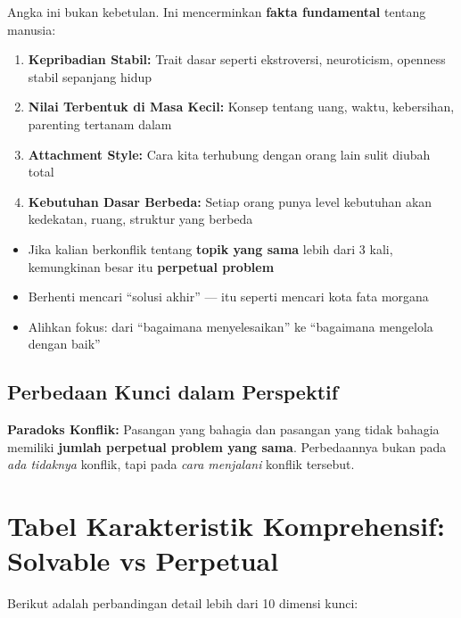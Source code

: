 Angka ini bukan kebetulan. Ini mencerminkan \textbf{fakta fundamental} tentang manusia:

\begin{enumerate}
    \item \textbf{Kepribadian Stabil:} Trait dasar seperti ekstroversi, neuroticism, openness stabil sepanjang hidup
    \item \textbf{Nilai Terbentuk di Masa Kecil:} Konsep tentang uang, waktu, kebersihan, parenting tertanam dalam
    \item \textbf{Attachment Style:} Cara kita terhubung dengan orang lain sulit diubah total
    \item \textbf{Kebutuhan Dasar Berbeda:} Setiap orang punya level kebutuhan akan kedekatan, ruang, struktur yang berbeda
\end{enumerate}

\begin{tipbox}
\begin{itemize}
    \item Jika kalian berkonflik tentang \textbf{topik yang sama} lebih dari 3 kali, kemungkinan besar itu \textbf{perpetual problem}
    \item Berhenti mencari ``solusi akhir'' --- itu seperti mencari kota fata morgana
    \item Alihkan fokus: dari ``bagaimana menyelesaikan'' ke ``bagaimana mengelola dengan baik''
\end{itemize}
\end{tipbox}

\subsection{Perbedaan Kunci dalam Perspektif}

\begin{insightbox}
\textbf{Paradoks Konflik:} Pasangan yang bahagia dan pasangan yang tidak bahagia memiliki \textbf{jumlah perpetual problem yang sama}. Perbedaannya bukan pada \textit{ada tidaknya} konflik, tapi pada \textit{cara menjalani} konflik tersebut.
\end{insightbox}

\section{Tabel Karakteristik Komprehensif: Solvable vs Perpetual}

Berikut adalah perbandingan detail lebih dari 10 dimensi kunci:


